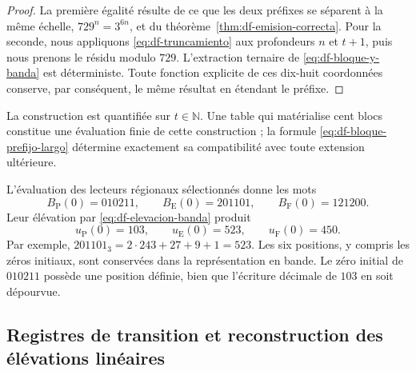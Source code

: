 \begin{proof}
La première égalité résulte de ce que les deux préfixes se séparent à la même
échelle, \(729^n=3^{6n}\), et du
théorème~\ref{thm:df-emision-correcta}. Pour la seconde, nous appliquons
\eqref{eq:df-truncamiento} aux profondeurs \(n\) et \(t+1\), puis
nous prenons le résidu modulo \(729\). L'extraction ternaire de
\eqref{eq:df-bloque-y-banda} est déterministe. Toute fonction explicite
de ces dix-huit coordonnées conserve, par conséquent, le même résultat en
étendant le préfixe.
\end{proof}

La construction est quantifiée sur \(t\in\mathbb N\). Une table qui
matérialise cent blocs constitue une évaluation finie de cette
construction ; la formule \eqref{eq:df-bloque-prefijo-largo} détermine
exactement sa compatibilité avec toute extension ultérieure.

\begin{example}
L'évaluation des lecteurs régionaux sélectionnés donne les mots
\[
 B_{\mathrm P}(0)=010211,\qquad
 B_{\mathrm E}(0)=201101,\qquad
 B_{\mathrm F}(0)=121200.
\]
Leur élévation par \eqref{eq:df-elevacion-banda} produit
\[
 u_{\mathrm P}(0)=103,\qquad
 u_{\mathrm E}(0)=523,\qquad
 u_{\mathrm F}(0)=450.
\]
Par exemple,
\(201101_3=2\cdot243+27+9+1=523\).
Les six positions, y compris les zéros initiaux, sont conservées dans la
représentation en bande. Le zéro initial de \(010211\) possède une position
définie, bien que l'écriture décimale de \(103\) en soit dépourvue.
\end{example}

\subsection{Registres de transition et reconstruction des élévations linéaires}
\label{subsec:df-registros-transicion}


